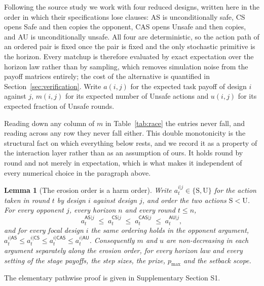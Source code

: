 \documentclass[a4paper,fleqn]{cas-sc}
\newtheorem{lemma}[theorem]{Lemma}
\newcommand{\AS}{\textsf{AS}}
\newcommand{\CS}{\textsf{CS}}
\newcommand{\CAS}{\textsf{CAS}}
\newcommand{\AU}{\textsf{AU}}
\begin{document}
Following the source study we work with four reduced designs, written here in
the order in which their specifications lose clauses: \AS{} is unconditionally
safe, \CS{} opens Safe and then copies the opponent, \CAS{} opens Unsafe and
then copies, and \AU{} is unconditionally unsafe. All four are deterministic,
so the action path of an ordered pair is fixed once the pair is fixed and the
only stochastic primitive is the horizon. Every matchup is therefore evaluated
by exact expectation over the horizon law rather than by sampling, which
removes simulation noise from the payoff matrices entirely; the cost of the
alternative is quantified in Section~\ref{sec:verification}. Write $a(i,j)$ for
the expected task payoff of design $i$ against $j$, $m(i,j)$ for its expected
number of Unsafe actions and $u(i,j)$ for its expected fraction of Unsafe
rounds.



Reading down any column of $m$ in Table~\ref{tab:race} the entries never fall,
and reading across any row they never fall either. This double monotonicity is
the structural fact on which everything below rests, and we record it as a
property of the interaction layer rather than as an assumption of ours. It
holds round by round and not merely in expectation, which is what makes it
independent of every numerical choice in the paragraph above.

\FloatBarrier

\begin{lemma}[The erosion order is a harm order]
\label{lem:order}
Write $a^{i|j}_{t}\in\{\mathrm{S},\mathrm{U}\}$ for the action taken in round
$t$ by design $i$ against design $j$, and order the two actions
$\mathrm{S}<\mathrm{U}$. For every opponent $j$, every horizon $n$ and every
round $t\le n$,
\begin{equation}
  a^{\AS{}|j}_{t}\;\le\;a^{\CS{}|j}_{t}\;\le\;a^{\CAS{}|j}_{t}
  \;\le\;a^{\AU{}|j}_{t},
  \label{eq:pathwise}
\end{equation}
and for every focal design $i$ the same ordering holds in the opponent
argument, $a^{i|\AS{}}_{t}\le a^{i|\CS{}}_{t}\le a^{i|\CAS{}}_{t}\le
a^{i|\AU{}}_{t}$. Consequently $m$ and $u$ are non-decreasing in each argument
separately along the erosion order, for every horizon law and every setting of
the stage payoffs, the step sizes, the prize, $p_{\max}$ and the setback scope.
\end{lemma}

The elementary pathwise proof is given in Supplementary Section S1.
\end{document}
